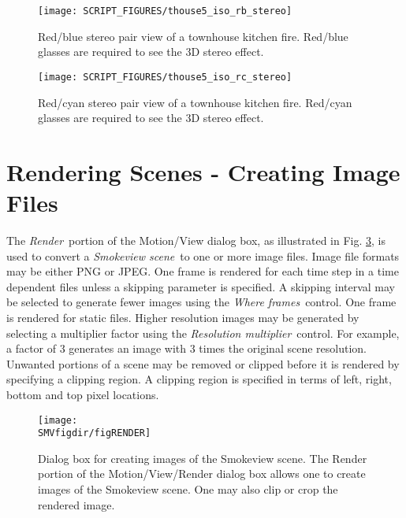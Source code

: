 \documentclass[11pt,twoside]{book}
\begin{document}
\begin{figure}[bph]
\begin{center}
\texttt{[image: SCRIPT\_FIGURES/thouse5\_iso\_rb\_stereo]}
\caption[Red/blue stereo pair view of a townhouse kitchen fire.]{
Red/blue stereo pair view of a townhouse kitchen fire. Red/blue
glasses are required to see the 3D stereo effect. }
\label{figrbstereo}
\end{center}
\end{figure}

\begin{figure}[bph]
\begin{center}
\texttt{[image: SCRIPT\_FIGURES/thouse5\_iso\_rc\_stereo]}
\caption[Red/cyan stereo pair view of a townhouse kitchen fire.]{
Red/cyan stereo pair view of a townhouse kitchen fire. Red/cyan
glasses are required to see the 3D stereo effect. }
\label{figrcstereo}
\end{center}
\end{figure}

\section{Rendering Scenes - Creating Image Files}
The {\em Render}\ portion of the Motion/View dialog box,
as illustrated in Fig. \ref{figMOTIONrender}, is used to convert a {\em Smokeview scene}\ to one or more image files.  Image file formats may be either PNG or JPEG. One frame is rendered for each time step in a time dependent files unless a skipping parameter is specified.
A skipping interval may be selected to generate fewer images using the {\em Where frames}\ control.  One frame is rendered for static files.  Higher resolution images may be generated by selecting a multiplier factor using the {\em Resolution multiplier}\ control. For example, a factor of 3 generates an image with 3 times the original scene resolution.  Unwanted portions of a scene may be removed or clipped before it is rendered by specifying a clipping region. A clipping region is specified in terms of left, right, bottom and top pixel locations.

\begin{figure}[bph]
\begin{center}
\texttt{[image: \\SMVfigdir/figRENDER]}
\caption[Dialog box for creating images of the Smokeview scene.]
{Dialog box for creating images of the Smokeview scene. The Render portion of the Motion/View/Render dialog box allows one to create images of the Smokeview scene. One may also clip or crop the rendered image.}
\label{figMOTIONrender}
\end{center}
\end{figure}
\end{document}
